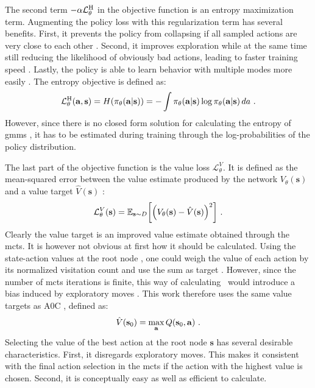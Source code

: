 The second term $- \alpha \mathcal L^{\text H}_\theta$ in the objective function is an entropy maximization term. Augmenting the policy loss with this regularization term has several benefits. First, it prevents the policy from collapsing if all sampled actions are very close to each other \cite{moerlandA0CAlphaZero2018}. Second, it improves exploration while at the same time still reducing the likelihood of obviously bad actions, leading to faster training speed \cite{haarnojaSoftActorCriticOffPolicy2018}. Lastly, the policy is able to learn behavior with multiple modes more easily \cite{haarnojaSoftActorCriticOffPolicy2018}. The entropy objective is defined as:
\begin{gather}
    \mathcal L^{\text H}_\theta (\mathbf a, \mathbf s) = H(\p) = - \int \p \log \p \, da~.
\end{gather}
However, since there is no closed form solution for calculating the entropy of \glspl{gmm} \cite{huberEntropyApproximationGaussian2008}, it has to be estimated during training through the log-probabilities of the policy distribution.

The last part of the objective function is the value loss $\mathcal L^V_\theta$. It is defined as the mean-squared error between the value estimate produced by the network $V_\theta (\mathbf s)$ and a value target $\hat{V} (\mathbf s)$ \cite{moerlandA0CAlphaZero2018}:
\begin{gather}
    \mathcal L^V_\theta (\mathbf s) = \E{\mathbf s \sim D} \bigg[ \Big( \Vest -  \Vtarget \Big)^2 \bigg]~.
\end{gather}
Clearly the value target is an improved value estimate obtained through the \gls{mcts}. It is however not obvious at first how it should be calculated. Using the state-action values at the root node \rootQ, one could weigh the value of each action by its normalized visitation count and use the sum as target \cite{moerlandA0CAlphaZero2018, willemsenValueTargetsOffpolicy}. However, since the number of \gls{mcts} iterations is finite, this way of calculating \Vtarget\ would introduce a bias induced by exploratory moves \cite{willemsenValueTargetsOffpolicy}. This work therefore uses the same value targets as A0C \cite{moerlandA0CAlphaZero2018}, defined as:
\begin{gather}\label{eq:value_target}
    \hat{V} (\mathbf s_0) = \max_{\mathbf a} \rootQ~.
\end{gather}
Selecting the value of the best action at the root node $\mathbf s$ has several desirable characteristics. First, it disregards exploratory moves. This makes it consistent with the final action selection in the \gls{mcts} if the action with the highest value is chosen. Second, it is conceptually easy as well as efficient to calculate.

